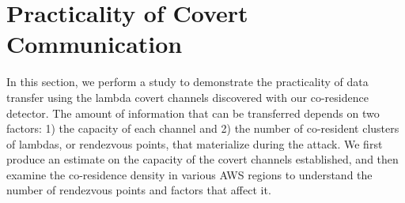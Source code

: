 \section{Practicality of Covert Communication}
\label{sec:study}

In this section, we perform a study to demonstrate the practicality of data
transfer using the lambda covert channels discovered with our co-residence
detector.  The amount of information that can be transferred depends on two
factors: 1) the capacity of each channel and 2) the number of co-resident
clusters of lambdas, or rendezvous points, that materialize during the attack.
We first produce an estimate on the capacity of the covert channels established,
and then examine the co-residence density in various AWS regions to understand
the number of rendezvous points and factors that affect it.


